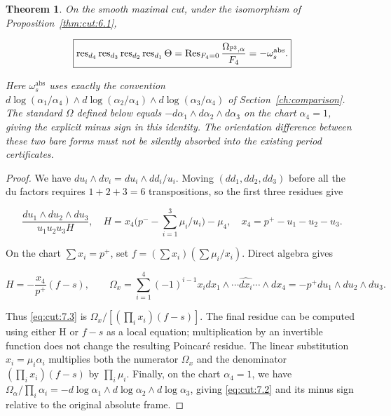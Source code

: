 \documentclass[11pt,a4paper,oneside]{article}
\theoremstyle{plain}
\newtheorem{theorem}{Theorem}[section]
\theoremstyle{definition}
\theoremstyle{remark}
\numberwithin{equation}{section}
\begin{document}
\begin{theorem}

\label{thm:cut:7.1} On the smooth maximal cut, under the isomorphism of Proposition~\ref{thm:cut:6.1},

\begin{equation}
\boxed{\operatorname{res}_{d_4}\operatorname{res}_{d_3}
 \operatorname{res}_{d_2}\operatorname{res}_{d_1}\Theta
       =\operatorname{Res}_{F_4=0}
                     \frac{\Omega_{\mathbb P^3,\alpha}}{F_4}
       =-\omega_s^{\rm abs}.}
                                                               \label{eq:cut:7.2}
\end{equation}

Here \(\omega _s^{\mathrm{abs}}\) uses exactly the convention \(d\log (\alpha _{1}/\alpha _{4})\wedge d\log (\alpha _{2}/\alpha _{4})\wedge d\log (\alpha _{3}/\alpha _{4})\) of Section~\ref{ch:comparison}. The standard \(\Omega \) defined below equals \(- d\alpha _{1}\wedge d\alpha _{2}\wedge d\alpha _{3}\) on the chart \(\alpha _{4}=1\), giving the explicit minus sign in this identity. The orientation difference between these two bare forms must not be silently absorbed into the existing period certificates.

\end{theorem}

\begin{proof}

We have \(du_i\wedge dv_i=du_i\wedge dd_i/u_i\). Moving \((dd_1,dd_2,dd_3)\) before all the du factors requires \(1+2+3=6\) transpositions, so the first three residues give

\begin{equation}
\frac{du_1\wedge du_2\wedge du_3}{u_1u_2u_3H},\quad
 H=x_4\Big(p^- -\sum_{i=1}^3\mu_i/u_i\Big)-\mu_4,
 \quad x_4=p^+-u_1-u_2-u_3.                           \label{eq:cut:7.3}
\end{equation}

On the chart \(\sum x_i=p^+\), set \(f=(\sum x_i)(\sum \mu _i/x_i)\). Direct algebra gives

\begin{equation}
H=-\frac{x_4}{p^+}(f-s),\qquad
 \Omega_x=\sum_{i=1}^4(-1)^{i-1}x_i
             dx_1\wedge\cdots\widehat{dx_i}\cdots\wedge dx_4
            =-p^+du_1\wedge du_2\wedge du_3.           \label{eq:cut:7.4}
\end{equation}

Thus \eqref{eq:cut:7.3} is \(\Omega _x/[(\prod_i x_i)(f- s)]\). The final residue can be computed using either H or \(f- s\) as a local equation; multiplication by an invertible function does not change the resulting Poincaré residue. The linear substitution \(x_i=\mu _i\alpha _i\) multiplies both the numerator \(\Omega _x\) and the denominator \((\prod_i x_i)(f- s)\) by \(\prod_i \mu_i\). Finally, on the chart \(\alpha _{4}=1\), we have \(\Omega _\alpha /\prod_i \alpha_i=- d\log \alpha _{1}\wedge d\log \alpha _{2}\wedge d\log \alpha _{3}\), giving \eqref{eq:cut:7.2} and its minus sign relative to the original absolute frame.

\end{proof}
\end{document}
